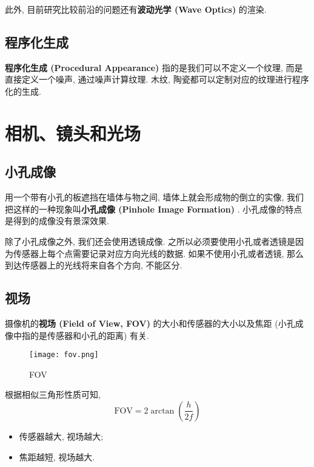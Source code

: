 此外, 目前研究比较前沿的问题还有\textbf{波动光学 (Wave Optics) }的渲染. 

\section{程序化生成}

\textbf{程序化生成 (Procedural Appearance) }指的是我们可以不定义一个纹理, 而是直接定义一个噪声, 通过噪声计算纹理. 木纹, 陶瓷都可以定制对应的纹理进行程序化的生成. 



\chapter{相机、镜头和光场}

\section{小孔成像}

用一个带有小孔的板遮挡在墙体与物之间, 墙体上就会形成物的倒立的实像, 我们把这样的一种现象叫\textbf{小孔成像 (Pinhole Image Formation) }. 小孔成像的特点是得到的成像没有景深效果. 

除了小孔成像之外, 我们还会使用透镜成像. 之所以必须要使用小孔或者透镜是因为传感器上每个点需要记录对应方向光线的数据. 如果不使用小孔或者透镜, 那么到达传感器上的光线将来自各个方向, 不能区分. 

\section{视场}

摄像机的\textbf{视场 (Field of View, FOV) }的大小和传感器的大小以及焦距 (小孔成像中指的是传感器和小孔的距离) 有关. 

\begin{figure}[H]
	\centering
	\texttt{[image: fov.png]}
	\caption{FOV}
	\label{fig:fov}
\end{figure}

根据相似三角形性质可知, 
\begin{equation}
	\text{FOV}=2\arctan(\frac{h}{2f})
\end{equation}

\begin{itemize}
	\item 传感器越大, 视场越大; 
	\item 焦距越短, 视场越大. 
\end{itemize}

